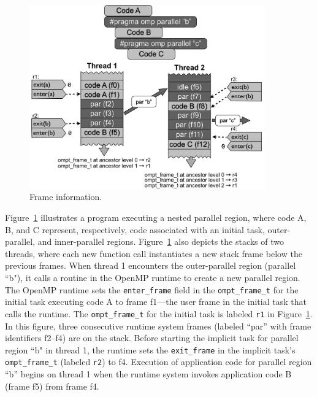 \documentclass{article}
\begin{document}
   \begin{figure}[h]
    \centering
        \includegraphics[width=4in]{callstack-cropped.pdf}
    \caption{Frame information.}
    \label{fig:frame}
\end{figure}

\noindent
Figure~\ref{fig:frame} illustrates a program executing a nested parallel region, where code A, B, and C represent, respectively, code associated with an initial task, outer-parallel, and inner-parallel regions.  Figure~\ref{fig:frame}  also depicts the stacks of two threads, where each new function call instantiates a new stack frame below the previous frames. When thread 1 encounters the outer-parallel region (parallel ``b"), it calls a routine in the OpenMP runtime to create a new parallel region. The OpenMP runtime sets the \verb|enter_frame| field in the \verb|ompt_frame_t| for the initial task executing code A to  frame f1---the user frame in the initial task that calls the runtime. The  \verb|ompt_frame_t| for the initial task is labeled  \verb|r1| in Figure~\ref{fig:frame}. In this figure, three consecutive runtime system frames (labeled ``par'' with frame identifiers f2--f4) are on the stack. 
Before starting the implicit task for parallel region ``b" in thread 1, the runtime sets the \verb|exit_frame| in the implicit task's \verb|ompt_frame_t|  (labeled \verb|r2|) to f4. Execution of application code for parallel region ``b''  begins on thread 1  when the runtime system invokes application code B (frame f5) from frame f4. 
\end{document}
